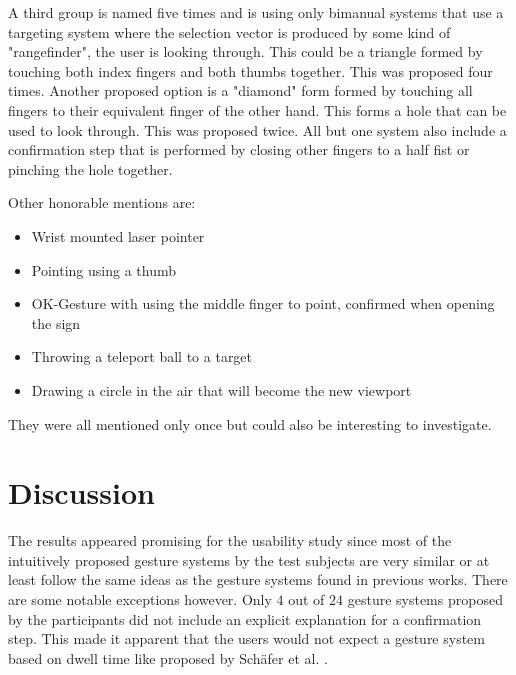 A third group is named five times and is using only bimanual systems that use a targeting system where the selection vector is produced by some kind of "rangefinder", the user is looking through. This could be a triangle formed by touching both index fingers and both thumbs together. This was proposed four times. Another proposed option is a "diamond" form formed by touching all fingers to their equivalent finger of the other hand. This forms a hole that can be used to look through. This was proposed twice. All but one system also include a confirmation step that is performed by closing other fingers to a half fist or pinching the hole together.

Other honorable mentions are:
\begin{itemize}
    \item Wrist mounted laser pointer
    \item Pointing using a thumb
    \item OK-Gesture with using the middle finger to point, confirmed when opening the sign
    \item Throwing a teleport ball to a target
    \item Drawing a circle in the air that will become the new viewport
\end{itemize}

They were all mentioned only once but could also be interesting to investigate.

\section{Discussion}
The results appeared promising for the usability study since most of the intuitively proposed gesture systems by the test subjects are very similar or at least follow the same ideas as the gesture systems found in previous works. There are some notable exceptions however. Only $4$ out of $24$ gesture systems proposed by the participants did not include an explicit explanation for a confirmation step. This made it apparent that the users would not expect a gesture system based on dwell time like proposed by Schäfer et al. \cite{Schafer2021}.